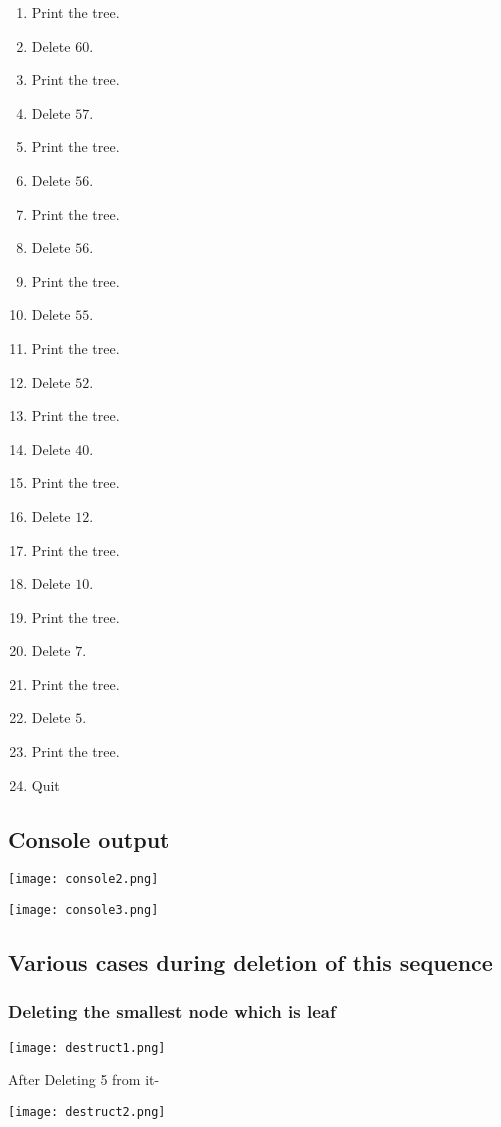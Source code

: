 \documentclass{article}
\begin{document}
\begin{enumerate}
	\item Print the tree.
	\item Delete $60$.
	\item Print the tree.
	\item Delete $57$.
	\item Print the tree.
	\item Delete $56$.
	\item Print the tree.
	\item Delete $56$.
	\item Print the tree.
	\item Delete $55$.
	\item Print the tree.
	\item Delete $52$.
	\item Print the tree.
	\item Delete $40$.
	\item Print the tree.
	\item Delete $12$.
	\item Print the tree.
	\item Delete $10$.
	\item Print the tree.
	\item Delete $7$.
	\item Print the tree.
	\item Delete $5$.
	\item Print the tree.
	\item Quit
\end{enumerate}

\subsection{Console output}
\begin{center}
\texttt{[image: console2.png]}
\end{center}
\begin{center}
\texttt{[image: console3.png]}
\end{center}

\subsection{Various cases during deletion of this sequence}
\subsubsection{Deleting the smallest node which is leaf}
\begin{center}
\texttt{[image: destruct1.png]}
\end{center}
After Deleting 5 from it-
\begin{center}
\texttt{[image: destruct2.png]}
\end{center}
\end{document}
